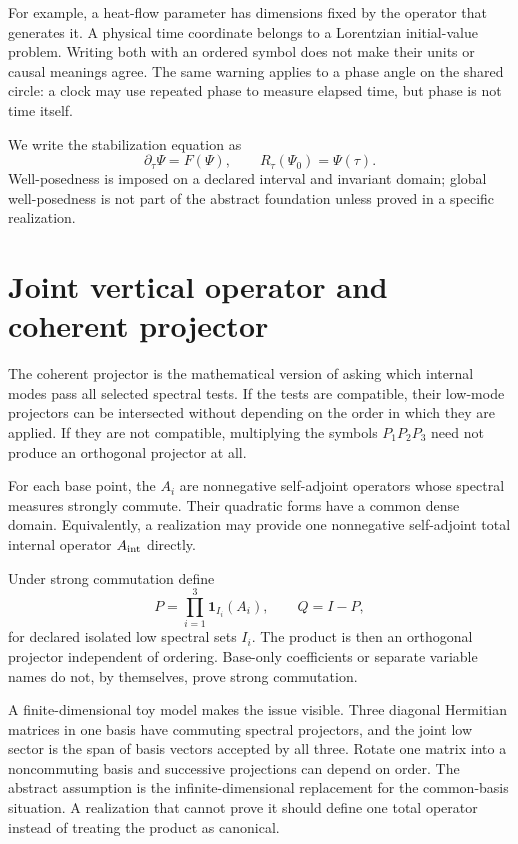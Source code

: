 \documentclass[11pt]{article}
\begin{document}
For example, a heat-flow parameter has dimensions fixed by the operator that
generates it. A physical time coordinate belongs to a Lorentzian
initial-value problem. Writing both with an ordered symbol does not make their
units or causal meanings agree. The same warning applies to a phase angle on
the shared circle: a clock may use repeated phase to measure elapsed time, but
phase is not time itself.

We write the stabilization equation as
\[
 \partial_\tau\Psi=F(\Psi),\qquad R_\tau(\Psi_0)=\Psi(\tau).
\]
Well-posedness is imposed on a declared interval and invariant domain; global
well-posedness is not part of the abstract foundation unless proved in a
specific realization.

\section{Joint vertical operator and coherent projector}

The coherent projector is the mathematical version of asking which internal
modes pass all selected spectral tests. If the tests are compatible, their
low-mode projectors can be intersected without depending on the order in which
they are applied. If they are not compatible, multiplying the symbols
$P_1P_2P_3$ need not produce an orthogonal projector at all.

\begin{assumption}\label{ass:joint}
For each base point, the $A_i$ are nonnegative self-adjoint operators whose
spectral measures strongly commute. Their quadratic forms have a common dense
domain. Equivalently, a realization may provide one nonnegative self-adjoint
total internal operator $A_{\rm int}$ directly.
\end{assumption}

Under strong commutation define
\[
 P=\prod_{i=1}^3\mathbf1_{I_i}(A_i),\qquad Q=I-P,
\]
for declared isolated low spectral sets $I_i$. The product is then an
orthogonal projector independent of ordering. Base-only coefficients or
separate variable names do not, by themselves, prove strong commutation.

A finite-dimensional toy model makes the issue visible. Three diagonal
Hermitian matrices in one basis have commuting spectral projectors, and the
joint low sector is the span of basis vectors accepted by all three. Rotate
one matrix into a noncommuting basis and successive projections can depend on
order. The abstract assumption is the infinite-dimensional replacement for
the common-basis situation. A realization that cannot prove it should define
one total operator instead of treating the product as canonical.
\end{document}

